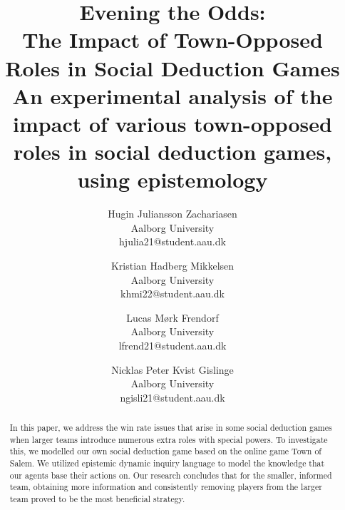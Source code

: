 \documentclass[twocolumn]{article}
\begin{document}

\title{Evening the Odds:\\ The Impact of Town-Opposed Roles in Social Deduction 
Games\\ \small An experimental analysis of the impact of various 
town-opposed roles in social deduction games, using epistemology}
\author{
	Hugin Juliansson Zachariasen \\ Aalborg University \\ hjulia21@student.aau.dk
	\and
	Kristian Hadberg Mikkelsen \\ Aalborg University \\ khmi22@student.aau.dk
	\and
	Lucas Mørk Frendorf \\ Aalborg University \\ lfrend21@student.aau.dk
	\and
	Nicklas Peter Kvist Gislinge \\ Aalborg University \\ ngisli21@student.aau.dk
}
\maketitle
\begin{abstract}
In this paper, we address the win rate issues that arise in some social deduction games when larger teams introduce numerous extra roles with special powers. To investigate this, we modelled our own social deduction game based on the online game Town of Salem. We utilized epistemic dynamic inquiry language to model the knowledge that our agents base their actions on. Our research concludes that for the smaller, informed team, obtaining more information and consistently removing players from the larger team proved to be the most beneficial strategy.
\end{abstract}










\clearpage
\appendix
\makeatletter
\def\@seccntformat#1{\appendixname\ \csname the#1\endcsname: }
\makeatother




\clearpage
\printbibliography[heading=bibintoc, title=Bibliography]
\label{bib:mybiblio}
\end{document}
